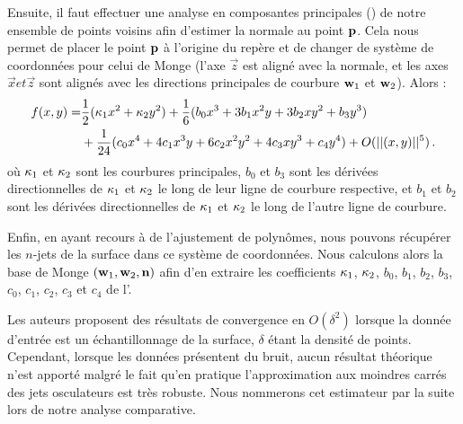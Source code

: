%
Ensuite, il faut effectuer une analyse en composantes principales (\ACP) de
notre ensemble de points voisins afin d'estimer la normale au point $\mathbf{p}$. Cela
nous permet de placer le point $\mathbf{p}$ à l'origine du repère et de changer de
système de coordonnées pour celui de Monge (l'axe $\vec{z}$ est aligné avec la
normale, et les axes $\vec{x} et \vec{z}$ sont alignés avec les directions
principales de courbure $\mathbf{w}_{1}$ et $\mathbf{w}_{2}$). Alors :
%
\begin{align} \label{eq:monge}
  f(x,y) = & \frac{1}{2}(\kappa_{1}x^2 + \kappa_{2}y^2)+ \frac{1}{6}(b_0x^3+3b_1x^2y+3b_2xy^2+b_3y^3) \\ & +\frac{1}{24}(c_0x^4+4c_1x^3y+6c_2x^2y^2+4c_3xy^3+c_4y^4) + O(||(x,y)||^{5}) \,.
\end{align}
%
où $\kappa_{1}$ et $\kappa_{2}$ sont les courbures principales, $b_0$ et
$b_3$ sont les dérivées directionnelles de $\kappa_{1}$ et $\kappa_{2}$ le
long de leur ligne de courbure respective, et $b_1$ et $b_2$ sont les dérivées
directionnelles de $\kappa_{1}$ et $\kappa_{2}$ le long de l'autre ligne de
courbure.
%


%
Enfin, en ayant recours à de l'ajustement de polynômes, nous pouvons récupérer
les $n$-jets de la surface dans ce système de coordonnées. Nous calculons alors
la base de Monge $(\mathbf{w}_{1}, \mathbf{w}_{2}, \mathbf{n})$ afin d'en extraire
les coefficients $\kappa_{1}$, $\kappa_{2}$, $b_0$, $b_1$, $b_2$, $b_3$,
$c_0$, $c_1$, $c_2$, $c_3$ et $c_4$ de l'.


%
%
%
Les auteurs proposent des résultats de convergence en $O(\delta^2)$ lorsque la
donnée d'entrée est un échantillonnage de la surface, $\delta$ étant la densité
de points. Cependant, lorsque les données présentent du bruit, aucun résultat
théorique n'est apporté malgré le fait qu'en pratique l'approximation aux
moindres carrés des jets osculateurs est très robuste.
%
Nous nommerons cet estimateur par la suite \JetFitting lors de notre analyse comparative.
%

